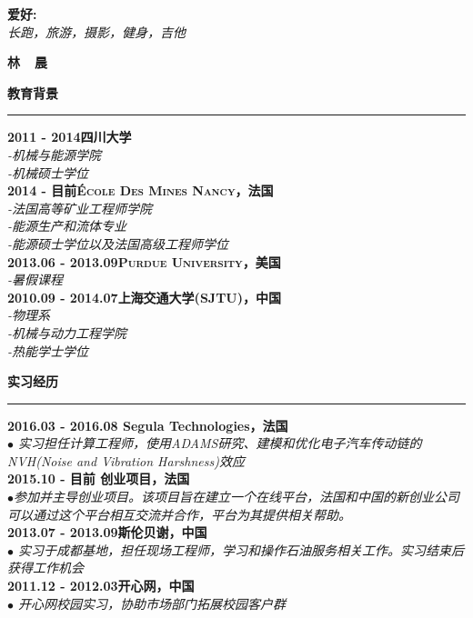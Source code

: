 \documentclass[a4paper,12pt,final]{memoir}
\newcommand{\myThemeColor}{RoyalBlue}
\newcommand{\SmallSep}{\vspace{0.9em}}
\newcommand{\CVSection}[1]
	{\Large\textbf{#1}\par
	\vspace{0.2cm}\normalsize\normalfont}
\newcommand{\CVItem}[1]
	{\textbf{\color{\myThemeColor} #1}}
\begin{document}
\begin{CJK*}{UTF8}{gbsn}
\begin{flushright}
	\CVItem{{\large 爱好:}}\\
	\textit{长跑，旅游，摄影，健身，吉他}
	\SmallSep
\end{flushright}\normalsize
\framebreak


\Huge\bfseries {\color{\myThemeColor} 林~~晨}\\
\normalsize\normalfont

\CVSection{教育背景}
\hrule
\SmallSep
\CVItem{2011 - 2014\hfill\textsc{四川大学}}\\
\textit{-机械与能源学院}\\
\textit{-机械硕士学位}
\\
\CVItem{2014 - 目前\hfill\textsc{\'{E}cole Des Mines Nancy，法国}}\\
\textit{-法国高等矿业工程师学院}\\
\textit{-能源生产和流体专业}\\
\textit{-能源硕士学位以及法国高级工程师学位}
\\
\CVItem{2013.06 - 2013.09\hfill\textsc{Purdue University，美国}}\\
\textit{-暑假课程}
\\
\CVItem{2010.09 - 2014.07\hfill\textsc{上海交通大学(SJTU)，中国}}\\
\textit{-物理系\\
-机械与动力工程学院}\\
\textit{-热能学士学位}

\CVSection{实习经历}
\hrule
\SmallSep
\CVItem{2016.03 - 2016.08 \hfill Segula Technologies，法国}\\
\textit{$\bullet$ 实习担任计算工程师，使用ADAMS研究、建模和优化电子汽车传动链的NVH(Noise and Vibration Harshness)效应}
\\
\CVItem{2015.10 - 目前 \hfill 创业项目，法国}\\
\textit{$\bullet$参加并主导创业项目。该项目旨在建立一个在线平台，法国和中国的新创业公司可以通过这个平台相互交流并合作，平台为其提供相关帮助。} 
\\
\CVItem{2013.07 - 2013.09\hfill 斯伦贝谢，中国}\\
\textit{$\bullet$ 实习于成都基地，担任现场工程师，学习和操作石油服务相关工作。实习结束后获得工作机会}
\\
\CVItem{2011.12 - 2012.03\hfill 开心网，中国}\\
\textit{$\bullet$ 开心网校园实习，协助市场部门拓展校园客户群}


\end{CJK*}
\end{document}

